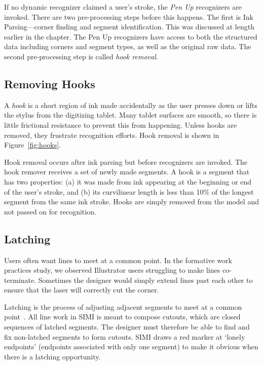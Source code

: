 If no dynamic recognizer claimed a user's stroke, the \textit{Pen Up}
recognizers are invoked. There are two pre-processing steps before
this happens. The first is Ink Parsing---corner finding and segment
identification. This was discussed at length earlier in the
chapter. The Pen Up recognizers have access to both the structured
data including corners and segment types, as well as the original raw
data. The second pre-processing step is called \textit{hook removal}.

\subsection{Removing Hooks}

A \textit{hook} is a short region of ink made accidentally as the user
presses down or lifts the stylus from the digitizing tablet. Many
tablet surfaces are smooth, so there is little frictional resistance
to prevent this from happening. Unless hooks are removed, they
frustrate recognition efforts. Hook removal is shown in
Figure~\ref{fig:hooks}.



Hook removal occurs after ink parsing but before recognizers are
invoked. The hook remover receives a set of newly made segments. A
hook is a segment that has two properties: (a) it was made from ink
appearing at the beginning or end of the user's stroke, and (b) its
curvilinear length is less than 10\% of the longest segment from the
same ink stroke. Hooks are simply removed from the model and not
passed on for recognition.

\subsection{Latching}



Users often want lines to meet at a common point. In the formative
work practices study, we observed Illustrator users struggling to make
lines co-terminate. Sometimes the designer would simply extend lines
past each other to ensure that the laser will correctly cut the
corner.

Latching is the process of adjusting adjacent segments to meet at a
common point~\cite{herot-latch-corners}. All line work in SIMI is
meant to compose cutouts, which are closed sequences of latched
segments. The designer must therefore be able to find and fix
non-latched segments to form cutouts. SIMI draws a red marker at
`lonely endpoints' (endpoints associated with only one segment) to
make it obvious when there is a latching opportunity.

